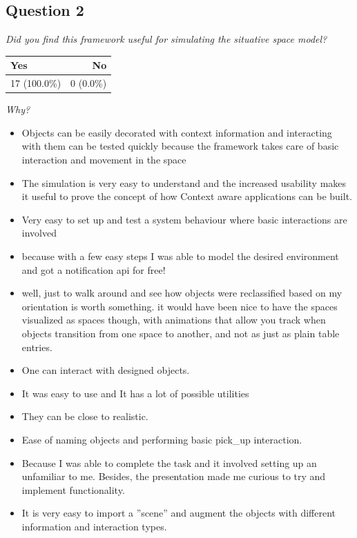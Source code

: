 \subsection{Question 2}
\emph{Did you find this framework useful for simulating the situative space model?}
\begin{table}[H]
	\begin{center}
		\small \begin{tabular*}{0.35\columnwidth}{lr}
			\\ \hline \hline
			Yes & No \\ \hline \hline

		 	17 (100.0\%) & 0 (0.0\%)\\ \hline
		\end{tabular*}
	\end{center}
\end{table}

\emph{Why?}
\begin{itemize}
	\item Objects can be easily decorated with context information and interacting with them can be tested quickly because the framework takes care of basic interaction and movement in the space
	\item The simulation is very easy to understand and the increased usability makes it useful to prove the concept of how Context aware applications can be built.
	\item Very easy to set up and test a system behaviour where basic interactions are involved
	\item because with a few easy steps I was able to model the desired environment and got a notification api for free!
	\item well, just to walk around and see how objects were reclassified based on my orientation is worth something. it would have been nice to have the spaces visualized as spaces though, with animations that allow you track when objects transition from one space to another, and not as just as plain table entries.
	\item One can interact with designed objects.
	\item It was easy to use and It has a lot of possible utilities
	\item They can be close to realistic.
	\item Ease of naming objects and performing basic pick\_up interaction.
	\item Because I was able to complete the task and it involved setting up an unfamiliar to me. Besides, the presentation made me curious to try and implement functionality.
	\item It is very easy to import a ''scene'' and augment the objects with different information and interaction types.
\end{itemize}

